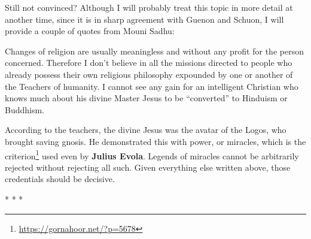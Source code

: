 Still not convinced? Although I will probably treat this topic in more detail at another time, since it is in sharp agreement with Guenon and Schuon, I will provide a couple of quotes from Mouni Sadhu:

\begin{quotex}
Changes of religion are usually meaningless and without any profit for the person concerned. Therefore I don't believe in all the missions directed to people who already possess their own religious philosophy expounded by one or another of the Teachers of humanity. I cannot see any gain for an intelligent Christian who knows much about his divine Master Jesus to be ``converted'' to Hinduism or Buddhism.
\end{quotex}


According to the teachers, the divine Jesus was the avatar of the Logos, who brought saving gnosis. He demonstrated this with power, or miracles, which is the criterion\footnote{\url{https://gornahoor.net/?p=5678}} used even by \textbf{Julius Evola}. Legends of miracles cannot be arbitrarily rejected without rejecting all such. Given everything else written above, those credentials should be decisive.



\begin{center}* * *\end{center}

